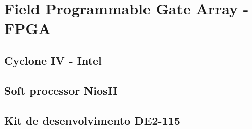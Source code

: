 \chapter{Field Programmable Gate Array - FPGA}


\section{Cyclone IV - Intel}

\section{Soft processor NiosII}

\section{Kit de desenvolvimento DE2-115}